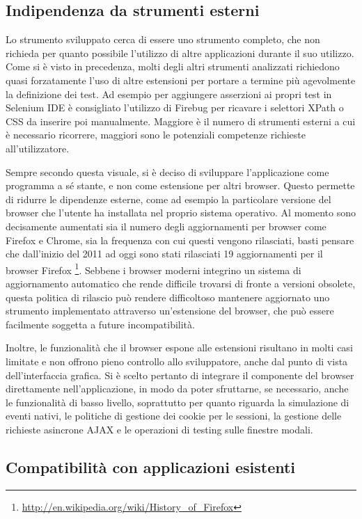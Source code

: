 \subsection{Indipendenza da strumenti esterni}

Lo strumento sviluppato cerca di essere uno strumento completo, che non richieda per quanto possibile l'utilizzo di altre applicazioni durante il suo utilizzo. Come si è visto in precedenza, molti degli altri strumenti analizzati richiedono quasi forzatamente l'uso di altre estensioni per portare a termine più agevolmente la definizione dei test. Ad esempio per aggiungere asserzioni ai propri test in Selenium IDE è consigliato l'utilizzo di Firebug per ricavare i selettori XPath o CSS da inserire poi manualmente. Maggiore è il numero di strumenti esterni a cui è necessario ricorrere, maggiori sono le potenziali competenze richieste all'utilizzatore.

Sempre secondo questa visuale, si è deciso di sviluppare l'applicazione come programma a sé stante, e non come estensione per altri browser. Questo permette di ridurre le dipendenze esterne, come ad esempio la particolare versione del browser che l'utente ha installata nel proprio sistema operativo. Al momento sono decisamente aumentati sia il numero degli aggiornamenti per browser come Firefox e Chrome, sia la frequenza con cui questi vengono rilasciati, basti pensare che dall'inizio del 2011 ad oggi sono stati rilasciati 19 aggiornamenti per il browser Firefox \footnote{\url{http://en.wikipedia.org/wiki/History_of_Firefox}}. Sebbene i browser moderni integrino un sistema di aggiornamento automatico che rende difficile trovarsi di fronte a versioni obsolete, questa politica di rilascio può rendere difficoltoso mantenere aggiornato uno strumento implementato attraverso un'estensione del browser, che può essere facilmente soggetta a future incompatibilità. 

Inoltre, le funzionalità che il browser espone alle estensioni risultano in molti casi limitate e non offrono pieno controllo allo sviluppatore, anche dal punto di vista dell'interfaccia grafica. Si è scelto pertanto di integrare il componente del browser direttamente nell'applicazione, in modo da poter sfruttarne, se necessario, anche le funzionalità di basso livello, soprattutto per quanto riguarda la simulazione di eventi nativi, le politiche di gestione dei cookie per le sessioni, la gestione delle richieste asincrone AJAX e le operazioni di testing sulle finestre modali. 

\subsection{Compatibilità con applicazioni esistenti}

